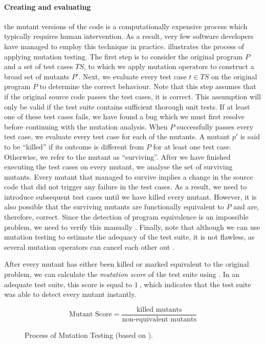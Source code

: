\paragraph*{Creating and evaluating} the mutant versions of the code is a computationally expensive process which typically requires human intervention. As a result, very few software developers have managed to employ this technique in practice.  illustrates the process of applying mutation testing. The first step is to consider the original program $P$ and a set of test cases $TS$, to which we apply mutation operators to construct a broad set of mutants $P'$. Next, we evaluate every test case $t \in TS$ on the original program $P$ to determine the correct behaviour. Note that this step assumes that if the original source code passes the test cases, it is correct. This assumption will only be valid if the test suite contains sufficient thorough unit tests. If at least one of these test cases fails, we have found a bug which we must first resolve before continuing with the mutation analysis. When $P$ successfully passes every test case, we evaluate every test case for each of the mutants. A mutant $p'$ is said to be ``killed'' if its outcome is different from $P$ for at least one test case. Otherwise, we refer to the mutant as ``surviving''. After we have finished executing the test cases on every mutant, we analyse the set of surviving mutants. Every mutant that managed to survive implies a change in the source code that did not trigger any failure in the test cases. As a result, we need to introduce subsequent test cases until we have killed every mutant. However, it is also possible that the surviving mutants are functionally equivalent to $P$ and are, therefore, correct. Since the detection of program equivalence is an impossible problem, we need to verify this manually \cite{5487526, Offutt2001}. Finally, note that although we can use mutation testing to estimate the adequacy of the test suite, it is not flawless, as several mutation operators can cancel each other out \cite{evaluationoftestsuiteminimization}.

\clearpage

\noindent After every mutant has either been killed or marked equivalent to the original problem, we can calculate the \emph{mutation score} of the test suite using . In an adequate test suite, this score is equal to $\SI{1}{}$, which indicates that the test suite was able to detect every mutant instantly.

\begin{equation}\label{eq:mutant-score}
	\text{Mutant Score} = \frac{\text{killed mutants}}{\text{non-equivalent mutants}}
\end{equation}

\begin{figure}[h!]
	\centering
	
	\caption{Process of Mutation Testing (based on \cite{Offutt2001}).}
	\label{fig:mutation-testing}
\end{figure}